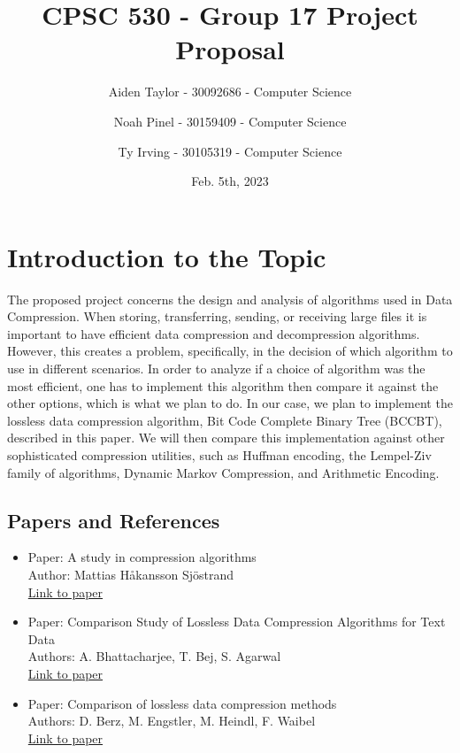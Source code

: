 \documentclass[11pt]{article}
\title{CPSC 530 - Group 17 Project Proposal}
\author{
Aiden Taylor - 30092686 - Computer Science
\and
Noah Pinel - 30159409 - Computer Science
\and
Ty Irving - 30105319 - Computer Science
}
\date{Feb. 5th, 2023}
\begin{document}
\maketitle
\newpage

\section*{Introduction to the Topic}
The proposed project concerns the design and analysis of algorithms used in Data Compression.
When storing, transferring, sending, or receiving large files it is important to have efficient data compression and decompression algorithms.
However, this creates a problem, specifically, in the decision of which algorithm to use in different scenarios.
In order to analyze if a choice of algorithm was the most efficient, one has to implement this algorithm then compare it against the other options,
which is what we plan to do.
In our case, we plan to implement
the lossless data compression algorithm, Bit Code Complete Binary Tree (BCCBT), described in this paper. 
We will then compare this implementation against other sophisticated compression utilities,
such as Huffman encoding, the Lempel-Ziv family of algorithms, Dynamic Markov Compression, and Arithmetic Encoding.

\subsection*{Papers and References}
\begin{itemize}
  \item Paper: A study in compression algorithms\\
        Author: Mattias Håkansson Sjöstrand\\ 
        \href{http://bth.diva-portal.org/smash/record.jsf?faces-redirect=true&aq2=%5B%5B%5D%5D&af=%5B%5D&searchType=SIMPLE&language=en&pid=diva2%3A830266&aq=%5B%5B%5D%5D&sf=all&aqe=%5B%5D&sortOrder=author_sort_asc&onlyFullText=false&noOfRows=50&dswid=482}{Link to paper}
  
  \item Paper: Comparison Study of Lossless Data Compression Algorithms for Text Data \\
        Authors: A. Bhattacharjee, T. Bej, S. Agarwal\\ 
        \href{https://www.semanticscholar.org/paper/Comparison-Study-of-Lossless-Data-Compression-for-Bhattacharjee-Bej/ac777e46e7473c9e20ae94cceb58dcd4c058ce01}{Link to paper}
  
  \item Paper: Comparison of lossless data compression methods \\
        Authors: D. Berz, M. Engstler, M. Heindl, F. Waibel\\
        \href{https://www.researchgate.net/publication/335572104_Comparison_of_lossless_data_compression_methods}{Link to paper}

\end{itemize}
\end{document}
